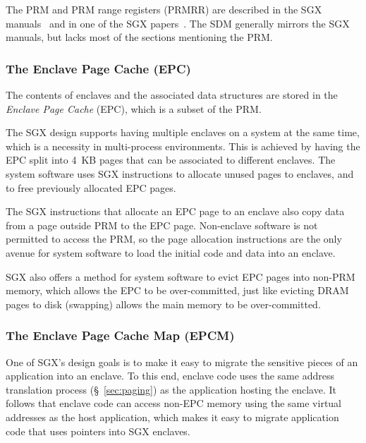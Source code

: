 The PRM and PRM range registers (PRMRR) are described in the SGX
manuals~\cite{intel2013sgxmanual, intel2014sgx2manual} and in one of the SGX
papers~\cite{mckeen2013sgx}. The SDM generally mirrors the SGX manuals, but
lacks most of the sections mentioning the PRM.


\subsubsection{The Enclave Page Cache (EPC)}
\label{sec:epc}


The contents of enclaves and the associated data structures are stored in the
\textit{Enclave Page Cache} (EPC), which is a subset of the PRM.

The SGX design supports having multiple enclaves on a system at the same time,
which is a  necessity in multi-process environments. This is achieved by having
the EPC split into 4~KB pages that can be associated to different enclaves. The
system software uses SGX instructions to allocate unused pages to enclaves, and
to free previously allocated EPC pages.

The SGX instructions that allocate an EPC page to an enclave also copy data
from a page outside PRM to the EPC page. Non-enclave software is not permitted
to access the PRM, so the page allocation instructions are the only avenue for
system software to load the initial code and data into an enclave.

SGX also offers a method for system software to evict EPC pages into non-PRM
memory, which allows the EPC to be over-committed, just like evicting DRAM
pages to disk (swapping) allows the main memory to be over-committed.


\subsubsection{The Enclave Page Cache Map (EPCM)}
\label{sec:epcm}


One of SGX's design goals is to make it easy to migrate the sensitive pieces of
an application into an enclave. To this end, enclave code uses the same address
translation process (\S~\ref{sec:paging}) as the application hosting the
enclave. It follows that enclave code can access non-EPC memory using the same
virtual addresses as the host application, which makes it easy to migrate
application code that uses pointers into SGX enclaves.

